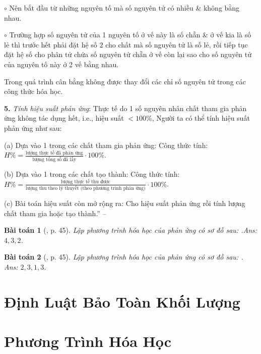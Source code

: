 \documentclass{article}
\numberwithin{equation}{section}
\newtheorem{baitoan}{Bài toán}
\begin{document}
\begin{enumerate*}
\begin{enumerate*}
\begin{enumerate*}
			\item[$\circ$] Nên bắt đầu từ những nguyên tố mà số nguyên tử có nhiều \& không bằng nhau.
			\item[$\circ$] Trường hợp số nguyên tử của 1 nguyên tố ở vế này là số chẵn \& ở vế kia là số lẻ thì trước hết phải đặt hệ số $2$ cho chất mà số nguyên tử là số lẻ, rồi tiếp tục đặt hệ số cho phân tử chứa số nguyên tử chẵn ở vế còn lại sao cho số nguyên tử của nguyên tố này ở 2 vế bằng nhau.
		\end{enumerate*}
	\end{enumerate*}
	Trong quá trình cân bằng không được thay đổi các chỉ số nguyên tử trong các công thức hóa học.
	\item[\textbf{5.}] \textit{Tính hiệu suất phản ứng}: Thực tế do 1 số nguyên nhân chất tham gia phản ứng không tác dụng hết, i.e., hiệu suất $< 100$\%, Người ta có thể tính hiệu suất phản ứng như sau:
	\begin{enumerate*}
		\item[(a)] Dựa vào 1 trong các chất tham gia phản ứng: Công thức tính: $H\% = \frac{\mbox{lượng thực tế đã phản ứng}}{\mbox{lượng tổng số đã lấy}}\cdot100\%$.
		\item[(b)] Dựa vào 1 trong các chất tạo thành: Công thức tính: $H\% = \frac{\mbox{lượng thực tế thu được}}{\mbox{lượng thu theo lý thuyết (theo phương trình phản ứng)}}\cdot100\%$.
		\item[(c)] Bài toán hiệu suất còn mở rộng ra: Cho hiệu suất phản ứng rồi tính lượng chất tham gia hoặc tạo thành.'' -- \cite[Chap. 2, pp. 44--46]{An_400_BT_Hoa_Hoc_8_2020}
	\end{enumerate*}
\end{enumerate*}

\begin{baitoan}[\cite{An_400_BT_Hoa_Hoc_8_2020}, p. 45]
	Lập phương trình hóa học của phản ứng có sơ đồ sau: \emph{}.\hfill\textsf{Ans:} $4,3,2$.
\end{baitoan}

\begin{baitoan}[\cite{An_400_BT_Hoa_Hoc_8_2020}, p. 45]
	Lập phương trình hóa học của phản ứng có sơ đồ sau: \emph{}.\\\mbox{}\hfill\textsf{Ans:} $2,3,1,3$.
\end{baitoan}








\section{Định Luật Bảo Toàn Khối Lượng}


\section{Phương Trình Hóa Học}


\printbibliography[heading=bibintoc]
	
\end{document}
